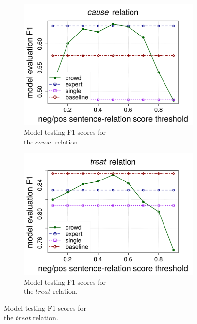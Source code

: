 \begin{figure}[htb!]
\centering
\begin{subfigure}{.5\textwidth}
\includegraphics[width=\linewidth]{img/cause_expert.pdf}
\caption{Model testing F1 scores for \\ the $cause$ relation.}
\label{fig:cause_exp_f1}
\end{subfigure}%
\begin{subfigure}{.5\textwidth}
\includegraphics[width=\linewidth]{img/treat_expert.pdf}
\caption{Model testing F1 scores for \\ the $treat$ relation.}
\label{fig:treats_exp_f1}
\end{subfigure}
\end{figure}

